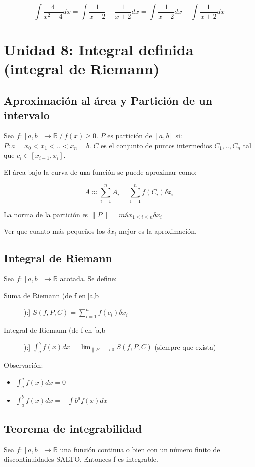 \documentclass{report}
\begin{document}
	$$\int\frac{4}{x^2-4}dx = \int\frac{1}{x-2}-\frac{1}{x+2}dx = \int\frac{1}{x-2}dx-\int\frac{1}{x+2}dx$$
		
\chapter{Unidad 8: Integral definida (integral de Riemann)}
	\section{Aproximación al área y Partición de un intervalo}
		Sea $f:[a,b]\to\mathbb{R} \ / \ f(x)\geq 0$. $P$ es partición de $[a,b]$ si: $P: a=x_0<x_1<..<x_n=b$. $C$ es el conjunto de puntos intermedios ${C_1,..,C_n}$ tal que $c_i\in[x_{i-1},x_i]$.
		
		El área bajo la curva de una función se puede aproximar como: 
		
			$$A \approx \sum_{i=1}^{n}A_i= \sum_{i=1}^{n}f(C_i)\delta x_i$$
		
		La norma de la partición es $\|P\| = máx_{1\leq i \leq n} \delta x_i$
		
		Ver que cuanto más pequeños los $\delta x_i$ mejor es la aproximación.
		
	\section{Integral de Riemann}
		Sea $f:[a,b]\to\mathbb{R}$ acotada. Se define:
		
		\begin{description}
			\item[Suma de Riemann (de f en [a,b]):] $S(f,P,C)=\sum_{i=1}^{n}f(c_i)\delta x_i$
			\item[Integral de Riemann (de f en [a,b]):] $\int_{a}^{b}f(x)dx=\lim_{\|P\| \to 0} S(f,P,C)$ (siempre que exista)
		\end{description}
		
		Observación:
		\begin{itemize}
			\item $\int_{a}^{a}f(x)dx=0$
			\item $\int_{a}^{b}f(x)dx=-\int{b}^{a}f(x)dx$
		\end{itemize}
	
	\section{Teorema de integrabilidad}
		Sea $f:[a,b]\to\mathbb{R}$ una función continua o bien con un número finito de discontinuidades SALTO. Entonces f es integrable.
		
\end{document}

